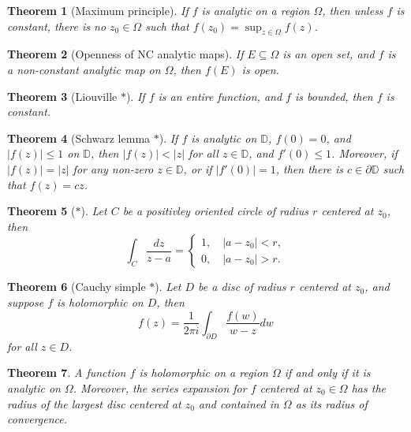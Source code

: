 \documentclass[12pt]{article}
\newtheorem{sats}{Theorem}
\theoremstyle{definition}
\newcommand{\D}{\mathbb{D}}      %
\begin{document}
\begin{sats}[Maximum principle]
    If $f$ is analytic on a region $\Omega$, then unless $f$ is constant, there is no $z_0\in\Omega$ such that $f(z_0)=\sup_{z\in\Omega} f(z)$.
\end{sats}

\begin{sats}[Openness of NC analytic maps]
    If $E\subseteq \Omega$ is an open set, and $f$ is a non-constant analytic map on $\Omega$, then $f(E)$ is open. 
\end{sats}

\begin{sats}[Liouville $*$]
    If $f$ is an entire function, and $f$ is bounded, then $f$ is constant.
\end{sats}

\begin{sats}[Schwarz lemma $*$]
    If $f$ is analytic on $\D$, $f(0)=0$, and $|f(z)|\leq 1$ on $\D$, then $|f(z)|<|z|$ for all $z\in\D$, and $f'(0)\leq 1$. Moreover, if $|f(z)|=|z|$ for any non-zero $z\in \D$, or if $|f'(0)|=1$, then there is $c\in\partial \D$ such that $f(z)=cz$.  
\end{sats}

\begin{sats}[$*$]
    Let $C$ be a positivley oriented circle of radius $r$ centered at $z_0$, then
    \begin{equation*}
        \int_C \frac{dz}{z-a}=\begin{cases}
            1,\quad |a-z_0|<r,\\
            0,\quad |a-z_0|>r.
        \end{cases}
    \end{equation*}
\end{sats}

\begin{sats}[Cauchy simple $*$]
    Let $D$ be a disc of radius $r$ centered at $z_0$, and suppose $f$ is holomorphic on $D$, then $$f(z)=\frac{1}{2\pi i}\int_{\partial D} \frac{f(w)}{w-z}dw$$ for all $z\in D$. 
\end{sats}

\begin{sats}
    A function $f$ is holomorphic on a region $\Omega$ if and only if it is analytic on $\Omega$. Moreover, the series expansion for $f$ centered at $z_0\in \Omega$ has the radius of the largest disc centered at $z_0$ and contained in $\Omega$ as its radius of convergence.
\end{sats}
\end{document}
